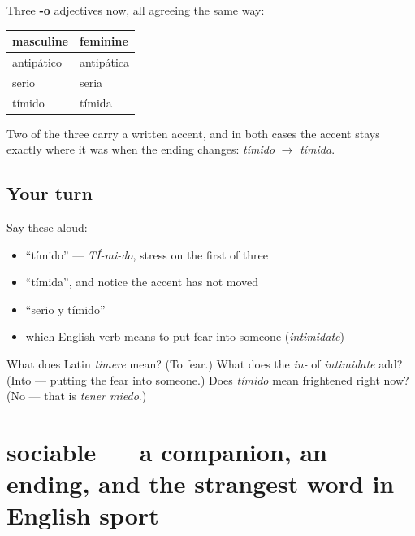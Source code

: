 \begin{grammarlens}[title={What you've built}]
Three \textbf{-o} adjectives now, all agreeing the same way:

\noindent
\begin{tabularx}{\linewidth}{@{}>{\raggedright\arraybackslash}X>{\raggedright\arraybackslash}X@{}}
\toprule
\textbf{masculine} & \textbf{feminine} \\
\midrule
antipático & antipática \\
serio & seria \\
tímido & tímida \\
\bottomrule
\end{tabularx}

Two of the three carry a written accent, and in both cases the accent stays exactly where it was when the ending changes: \emph{tímido} $\to$ \emph{tímida}.
\end{grammarlens}

\subsection*{Your turn}
Say these aloud:

\begin{itemize}
\raggedright
  \item \textquotedblleft{}tímido\textquotedblright{} — \emph{TÍ-mi-do}, stress on the first of three
  \item \textquotedblleft{}tímida\textquotedblright{}, and notice the accent has not moved
  \item \textquotedblleft{}serio y tímido\textquotedblright{}
  \item which English verb means to put fear into someone (\emph{intimidate})
\end{itemize}

\begin{tcolorbox}[breakable,colback=teal!4,colframe=teal!35!black,title={Before you move on}]
What does Latin \emph{timere} mean? (To fear.) What does the \emph{in-} of \emph{intimidate} add? (Into — putting the fear into someone.) Does \emph{tímido} mean frightened right now? (No — that is \emph{tener miedo}.)
\end{tcolorbox}
\section[sociable]{sociable — a companion, an ending, and the strangest word in English sport}

\label{lesson:ES-C423-sociable}



